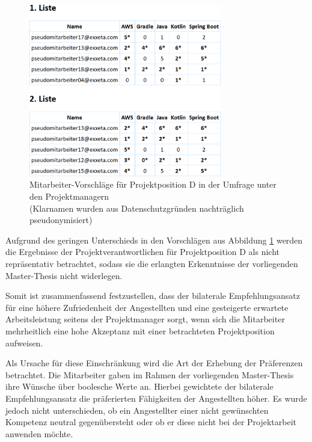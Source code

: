 \begin{figure}[h]
	\centering
	\includegraphics[width=0.75\textwidth]{gfx/projektposition-d.png}
	\caption[Mitarbeiter-Vorschläge für Projektposition D in der Umfrage unter den Projektmanagern]{Mitarbeiter-Vorschläge für Projektposition D in der Umfrage unter den Projektmanagern\\
	(Klarnamen wurden aus Datenschutzgründen nachträglich pseudonymisiert)}
	\label{fig:diskussion:interpretation:abb2}
\end{figure}

Aufgrund des geringen Unterschieds in den Vorschlägen aus Abbildung \ref{fig:diskussion:interpretation:abb2} werden die Ergebnisse der Projektverantwortlichen für Projektposition D als nicht repräsentativ betrachtet, sodass sie die erlangten Erkenntnisse der vorliegenden Master-Thesis nicht widerlegen.

Somit ist zusammenfassend festzustellen, dass der bilaterale Empfehlungsansatz für eine höhere Zufriedenheit der Angestellten und eine gesteigerte erwartete Arbeitsleistung seitens der Projektmanager sorgt, wenn sich die Mitarbeiter mehrheitlich eine hohe Akzeptanz mit einer betrachteten Projektposition aufweisen.

Als Ursache für diese Einschränkung wird die Art der Erhebung der Präferenzen betrachtet. Die Mitarbeiter gaben im Rahmen der vorliegenden Master-Thesis ihre Wünsche über boolesche Werte an. Hierbei gewichtete der bilaterale Empfehlungsansatz die präferierten Fähigkeiten der Angestellten höher. Es wurde jedoch nicht unterschieden, ob ein Angestellter einer nicht gewünschten Kompetenz neutral gegenübersteht oder ob er diese nicht bei der Projektarbeit anwenden möchte.


